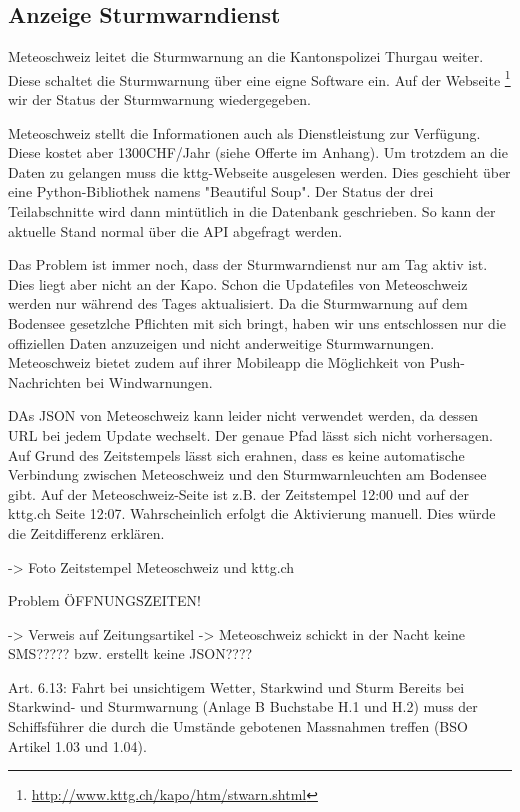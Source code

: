 \subsection{Anzeige Sturmwarndienst}

Meteoschweiz leitet die Sturmwarnung an die Kantonspolizei Thurgau weiter. Diese schaltet die Sturmwarnung über eine eigne Software ein. Auf der Webseite \footnote{ \url{http://www.kttg.ch/kapo/htm/stwarn.shtml}} wir der Status der Sturmwarnung wiedergegeben.

Meteoschweiz stellt die Informationen auch als Dienstleistung zur Verfügung. Diese kostet aber 1300CHF/Jahr (siehe Offerte im Anhang). Um trotzdem an die Daten zu gelangen muss die kttg-Webseite ausgelesen werden.
Dies geschieht über eine Python-Bibliothek namens "Beautiful Soup". Der Status der drei Teilabschnitte wird dann mintütlich in die Datenbank geschrieben. So kann der aktuelle Stand normal über die API abgefragt werden.

Das Problem ist immer noch, dass der Sturmwarndienst nur am Tag aktiv ist. Dies liegt aber nicht an der Kapo. Schon die Updatefiles von Meteoschweiz werden nur während des Tages aktualisiert. Da die Sturmwarnung auf dem Bodensee gesetzlche Pflichten mit sich bringt, haben wir uns entschlossen nur die offiziellen Daten anzuzeigen und nicht anderweitige Sturmwarnungen. Meteoschweiz bietet zudem auf ihrer Mobileapp die Möglichkeit von Push-Nachrichten bei Windwarnungen.

DAs JSON von Meteoschweiz kann leider nicht verwendet werden, da dessen URL bei jedem Update wechselt. Der genaue Pfad lässt sich nicht vorhersagen. Auf Grund des Zeitstempels lässt sich erahnen, dass es keine automatische Verbindung zwischen Meteoschweiz und den Sturmwarnleuchten am Bodensee gibt. Auf der Meteoschweiz-Seite ist z.B. der Zeitstempel 12:00 und auf der kttg.ch Seite 12:07. Wahrscheinlich erfolgt die Aktivierung manuell. Dies würde die Zeitdifferenz erklären.

-> Foto Zeitstempel Meteoschweiz und kttg.ch






Problem ÖFFNUNGSZEITEN!

-> Verweis auf Zeitungsartikel
-> Meteoschweiz schickt in der Nacht keine SMS????? bzw. erstellt keine JSON????


Art. 6.13: Fahrt bei unsichtigem Wetter, Starkwind und Sturm
Bereits bei Starkwind- und Sturmwarnung (Anlage B Buchstabe H.1 und H.2) muss der Schiffsführer die durch die Umstände gebotenen Massnahmen treffen
(BSO Artikel 1.03 und 1.04).


